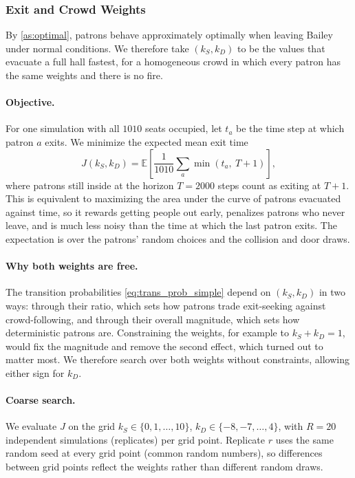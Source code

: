 \documentclass[14pt]{article}
\theoremstyle{definition}
\begin{document}
\subsubsection{Exit and Crowd Weights}\label{sec:learn_kS_kD}

By \cref{as:optimal}, patrons behave approximately optimally when leaving Bailey under
normal conditions. We therefore take $(k_S, k_D)$ to be the values that evacuate a full
hall fastest, for a homogeneous crowd in which every patron has the same weights and
there is no fire.

\paragraph{Objective.} For one simulation with all $1010$ seats occupied, let $t_a$ be the
time step at which patron $a$ exits. We minimize the expected mean exit time
\begin{equation}\label{eq:baseline_objective}
  J(k_S, k_D) = \mathbb{E}\left[\frac{1}{1010}\sum_{a} \min(t_a,\ T + 1)\right],
\end{equation}
where patrons still inside at the horizon $T = 2000$ steps count as exiting at $T + 1$.
This is equivalent to maximizing the area under the curve of patrons evacuated against
time, so it rewards getting people out early, penalizes patrons who never leave, and is
much less noisy than the time at which the last patron exits. The expectation is over
the patrons' random choices and the collision and door draws.

\paragraph{Why both weights are free.} The transition probabilities
\cref{eq:trans_prob_simple} depend on $(k_S, k_D)$ in two ways: through their ratio, which
sets how patrons trade exit-seeking against crowd-following, and through their overall
magnitude, which sets how deterministic patrons are. Constraining the weights, for
example to $k_S + k_D = 1$, would fix the magnitude and remove the second effect, which
turned out to matter most. We therefore search over both weights without constraints,
allowing either sign for $k_D$.

\paragraph{Coarse search.} We evaluate $J$ on the grid
$k_S \in \{0, 1, \dots, 10\}$, $k_D \in \{-8, -7, \dots, 4\}$, with $R = 20$ independent
simulations (replicates) per grid point. Replicate $r$ uses the same random seed at every
grid point (common random numbers), so differences between grid points reflect the
weights rather than different random draws.
\end{document}
